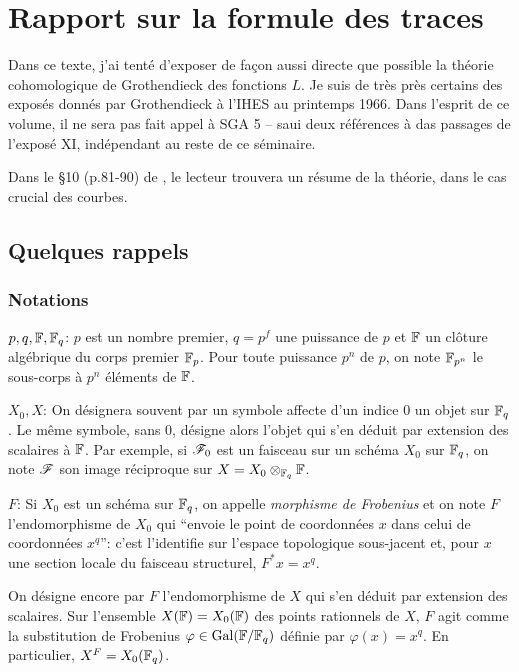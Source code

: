 
\chapter{Rapport sur la formule des traces}\label{II}

Dans ce texte, j'ai tenté d'exposer de façon aussi directe que possible la 
théorie cohomologique de Grothendieck des fonctions $L$. Je suis de très près 
certains des exposés donnés par Grothendieck à l'IHES au printemps 1966. Dans 
l'esprit de ce volume, il ne sera pas fait appel à SGA 5 -- saui deux 
références à das passages de l'exposé XI, indépendant au reste de ce 
séminaire. 

Dans le \S 10 (p.81-90) de \cite{de73}, le lecteur trouvera un résume de la 
théorie, dans le cas crucial des courbes. 










\section{Quelques rappels}\label{II:1}





\subsection{Notations}\label{II:1-1}

$p,q,\mathbb{F},\mathbb{F}_q$: $p$ est un nombre premier, $q=p^f$ une puissance de $p$ et 
$\mathbb{F}$ un clôture algébrique du corps premier $\mathbb{F}_p$. Pour toute puissance 
$p^n$ de $p$, on note $\mathbb{F}_{p^n}$ le sous-corps à $p^n$ éléments de $\mathbb{F}$. 

$X_0,X$: On désignera souvent par un symbole affecte d'un indice $0$ un objet 
sur $\mathbb{F}_q$. Le même symbole, sans $0$, désigne alors l'objet qui s'en déduit 
par extension des scalaires à $\mathbb{F}$. Par exemple, si $\mathscr{F}_0$ est un faisceau 
sur un schéma $X_0$ sur $\mathbb{F}_q$, on note $\mathscr{F}$ son image réciproque sur 
$X=X_0\otimes_{\mathbb{F}_q} \mathbb{F}$. 

$F$: Si $X_0$ est un schéma sur $\mathbb{F}_q$, on appelle \emph{morphisme de 
Frobenius} et on note $F$ l'endomorphisme de $X_0$ qui ``envoie le point de 
coordonnées $x$ dans celui de coordonnées $x^q$'': c'est l'identifie sur 
l'espace topologique sous-jacent et, pour $x$ une section locale du faisceau 
structurel, $F^* x = x^q$. 

On désigne encore par $F$ l'endomorphisme de $X$ qui s'en déduit par 
extension des scalaires. Sur l'ensemble $X(\mathbb{F}) = X_0(\mathbb{F})$ des points 
rationnels de $X$, $F$ agit comme la substitution de Frobenius 
$\varphi\in\operatorname{Gal}(\mathbb{F}/\mathbb{F}_q)$ définie par $\varphi(x)=x^q$. En particulier, 
$X^F=X_0(\mathbb{F}_q)$. 


